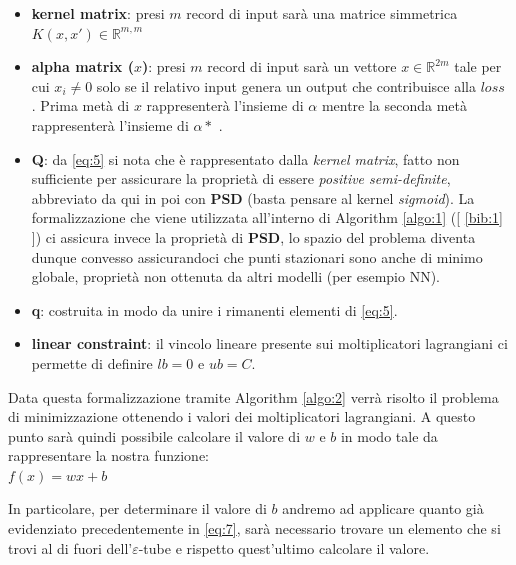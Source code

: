 \documentclass[12pt]{article}
\begin{document}
	\begin{itemize}
		\item \textbf{kernel matrix}: presi $m$ record di input sarà una matrice simmetrica $ K(x,x') \in \mathbb{R}^{m,m}$
		\item \textbf{alpha matrix ($x$)}: presi $m$ record di input sarà un vettore $ x \in \mathbb{R}^{2m} $ tale per cui $x_i \neq 0$ solo se il relativo input genera un output che contribuisce alla $loss$ . Prima metà di $x$ rappresenterà l'insieme di $\alpha$ mentre la seconda metà rappresenterà l'insieme di $\alpha*$ .
		\item \textbf{Q}: da \eqref{eq:5} si nota che è rappresentato dalla \textit{kernel matrix}, fatto non sufficiente per assicurare la proprietà di essere \textit{positive semi-definite}, abbreviato da qui in poi con \textbf{PSD} (basta pensare al kernel \textit{sigmoid}). La formalizzazione che viene utilizzata all’interno di Algorithm \ref{algo:1} ({[ \ref{bib:1} ]}) ci assicura invece la proprietà di \textbf{PSD},  lo spazio del problema diventa dunque convesso assicurandoci che punti stazionari sono anche di minimo globale, proprietà non ottenuta da altri modelli (per esempio NN). 
		\item \textbf{q}: costruita in modo da unire i rimanenti elementi di \eqref{eq:5}.
		\item \textbf{linear constraint}: il vincolo lineare presente sui moltiplicatori lagrangiani ci permette di definire $lb=0$ e $ub=C$.
	\end{itemize}
		
	Data questa formalizzazione tramite Algorithm \ref{algo:2} verrà risolto il problema di minimizzazione ottenendo i valori dei moltiplicatori lagrangiani. A questo punto sarà quindi possibile calcolare il valore di $w$ e $b$ in modo tale da rappresentare la nostra funzione:\\
	$f(x)=wx+b$

	In particolare, per determinare il valore di $b$ andremo ad applicare quanto già evidenziato precedentemente in \eqref{eq:7}, sarà necessario trovare un elemento che si trovi al di fuori dell’$\varepsilon$-tube e rispetto quest’ultimo calcolare il valore.


\end{document}
